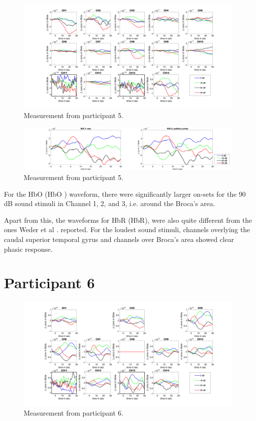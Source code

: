 \begin{figure}[H]
  \centering
    \includegraphics[scale=.4]{bilder/HbR_Mole/sub_lukas_s_HbR.png}
  \caption{Measurement from participant 5.}
  \label{fig:somesignal}
\end{figure}

\begin{figure}[H]
  \centering
    \includegraphics[scale=.29]{bilder/ROI/sub_lukas_s_HbO.png}
  \caption{Measurement from participant 5.}
\end{figure}

For the \acrlong{HbO} (\acrshort{HbO} ) waveform, there were significantly larger on-sets for the 90 dB sound stimuli in Channel 1, 2, and 3, i.e. around the Broca's area.

Apart from this, the waveforms for \acrlong{HbR} (\acrshort{HbR}), were also quite different from the ones Weder et al \citeyear{Weder2018}. reported. For the loudest sound stimuli, channels overlying the caudal superior temporal gyrus and channels over Broca's area showed clear phasic response. 


\newpage




\section {Participant 6}
\begin{figure}[H]
  \centering
    \includegraphics[scale=.4]{bilder/HbO_Mole/sub_shelia_s_HbO.png}
  \caption{Measurement from participant 6.}
  \label{fig:somesignal}
\end{figure}

